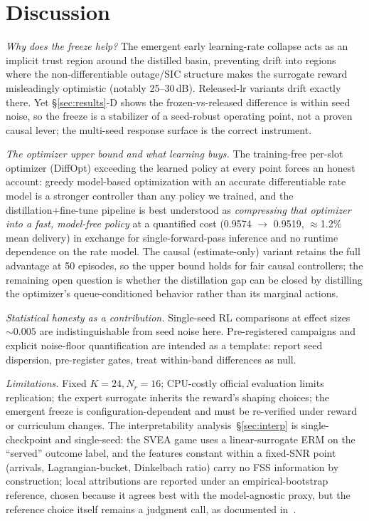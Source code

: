 \documentclass[journal]{IEEEtran}
\begin{document}
\section{Discussion}
\label{sec:discussion}

\emph{Why does the freeze help?} The emergent early learning-rate collapse acts as
an implicit trust region around the distilled basin, preventing drift into regions
where the non-differentiable outage/SIC structure makes the surrogate reward
misleadingly optimistic (notably 25--30\,dB). Released-lr variants drift exactly
there. Yet \S\ref{sec:results}-D shows the frozen-vs-released difference is within
seed noise, so the freeze is a stabilizer of a seed-robust operating point, not a
proven causal lever; the multi-seed response surface is the correct instrument.

\emph{The optimizer upper bound and what learning buys.} The training-free
per-slot optimizer (DiffOpt) exceeding the learned policy at every point forces an
honest account: greedy model-based optimization with an accurate differentiable
rate model is a stronger controller than any policy we trained, and the
distillation+fine-tune pipeline is best understood as \emph{compressing that
optimizer into a fast, model-free policy} at a quantified cost
(0.9574 $\to$ 0.9519, $\approx$1.2\% mean delivery) in exchange for
single-forward-pass inference and no runtime dependence on the rate model. The
causal (estimate-only) variant retains the full advantage at 50 episodes, so the
upper bound holds for fair causal controllers; the remaining open question is
whether the distillation gap can be closed by distilling the optimizer's
queue-conditioned behavior rather than its marginal actions.

\emph{Statistical honesty as a contribution.} Single-seed RL comparisons at effect
sizes $\sim0.005$ are indistinguishable from seed noise here. Pre-registered
campaigns and explicit noise-floor quantification are intended as a template:
report seed dispersion, pre-register gates, treat within-band differences as null.

\emph{Limitations.} Fixed $K=24,N_r=16$; CPU-costly official evaluation limits
replication; the expert surrogate inherits the reward's shaping choices; the
emergent freeze is configuration-dependent and must be re-verified under reward or
curriculum changes. The interpretability analysis~\S\ref{sec:interp} is
single-checkpoint and single-seed: the SVEA game uses a linear-surrogate ERM on
the ``served'' outcome label, and the features constant within a fixed-SNR point
(arrivals, Lagrangian-bucket, Dinkelbach ratio) carry no FSS information by
construction; local attributions are reported under an empirical-bootstrap
reference, chosen because it agrees best with the model-agnostic proxy, but the
reference choice itself remains a judgment call, as documented
in~\cite{fernando2019deepshap}.
\end{document}
